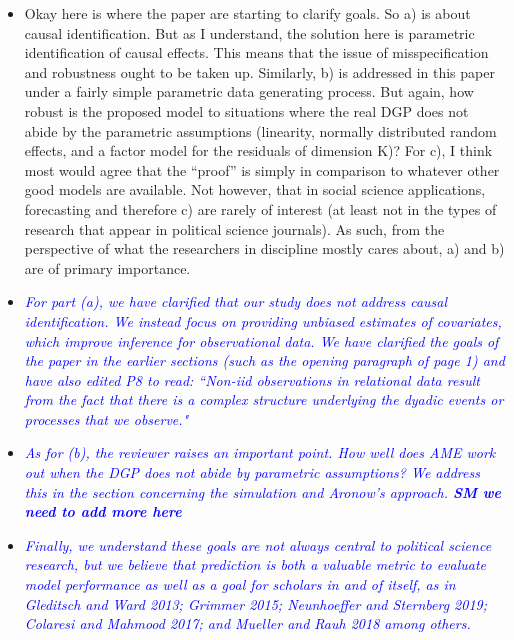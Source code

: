 \begin{enumerate}
	\begin{itemize}
		\item Okay here is where the paper are starting to clarify goals.  So a) is about causal identification.  But as I understand, the solution here is parametric identification of causal effects.  This means that the issue of misspecification and robustness ought to be taken up.  Similarly, b) is addressed in this paper under a fairly simple parametric data generating process. But again, how robust is the proposed model to situations where the real DGP does not abide by the parametric assumptions (linearity, normally distributed random effects, and a factor model for the residuals of dimension K)? For c), I think most would agree that the “proof” is simply in comparison to whatever other good models are available.  Not however, that in social science applications, forecasting and therefore c) are rarely of interest (at least not in the types of research that appear in political science journals).  As such, from the perspective of what the researchers in discipline mostly cares about, a) and b) are of primary importance.
	\end{itemize}
	\begin{itemize}
		\item  \emph{\textcolor{blue}{
For part (a), we have clarified that our study does not address causal identification. We instead focus on providing unbiased estimates of covariates, which improve inference for observational data. We have clarified the goals of the paper in the earlier sections (such as the opening paragraph of page 1) and have also edited P8 to read: ``Non-iid observations in relational data result from the fact that there is a complex structure underlying the dyadic events or processes that we observe." }}
		\item \emph{\textcolor{blue}{As for (b), the reviewer raises an important point. How well does AME work out when the DGP does not abide by parametric assumptions? We address this in the section concerning the simulation and Aronow's approach. \textbf{SM we need to add more here}}} 
		\item \emph{\textcolor{blue}{Finally, we understand these goals are not always central to political science research, but we believe that prediction is both a valuable metric to evaluate model performance as well as a goal for scholars in and of itself, as in Gleditsch and Ward 2013; Grimmer 2015; Neunhoeffer and Sternberg 2019; Colaresi and Mahmood 2017; and Mueller and Rauh 2018 among others.}
		}
	\end{itemize}

\end{enumerate}
